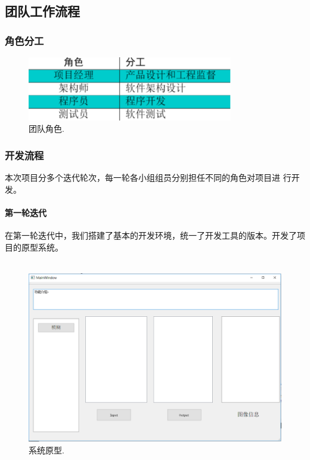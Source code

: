 \documentclass[14pt,a4paper]{article}
\begin{document}
\subsection{团队工作流程}
\subsubsection{角色分工}
\nopagebreak
\begin{figure}[h]
\begin{center}
\includegraphics[width=0.8\textwidth]{image/role} 
\caption{团队角色.}
\end{center}
\end{figure}

\newpage
\subsubsection{开发流程}
本次项目分多个迭代轮次，每一轮各小组组员分别担任不同的角色对项目进
行开发。

\paragraph{第一轮迭代}
在第一轮迭代中，我们搭建了基本的开发环境，统一了开发工具的版本。开发了项目的原型系统。\\\\
\begin{figure}[h]
\begin{center}
\includegraphics[height=0.4\textwidth]{image/prototype} 
\caption{系统原型.}
\end{center}
\end{figure}
\end{document}
